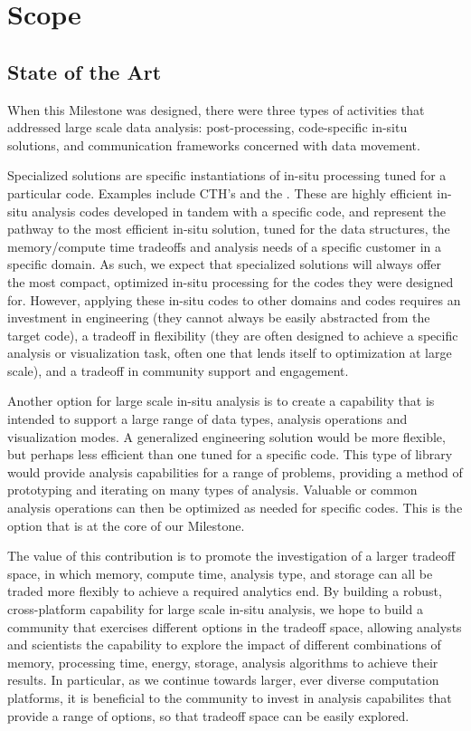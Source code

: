 \section{Scope}
\label{sec:Scope}

\subsection{State of the Art}

When this Milestone was designed, there were three types of activities that addressed large scale data analysis: post-processing, code-specific in-situ solutions, and communication frameworks concerned with data movement.

Specialized solutions are specific instantiations of in-situ processing tuned for a particular code.  Examples include CTH's  and the .  These are highly efficient in-situ analysis codes developed in tandem with a specific code, and represent the pathway to the most efficient in-situ solution, tuned for the data structures, the memory/compute time tradeoffs and analysis needs of a specific customer in a specific domain.  As such, we expect that specialized solutions will always offer the most compact, optimized in-situ processing for the codes they were designed for.  However, applying these in-situ codes to other domains and codes requires an investment in engineering (they cannot always be easily abstracted from the target code), a tradeoff in flexibility (they are often designed to achieve a specific analysis or visualization task, often one that lends itself to optimization at large scale), and a tradeoff in community support and engagement.

Another option for large scale in-situ analysis is to create a capability that is intended to support a large range of data types, analysis operations and visualization modes.  A generalized engineering solution would be more flexible, but perhaps less efficient than one tuned for a specific code.  This type of library would provide analysis capabilities for a range of problems, providing a method of prototyping and iterating on many types of analysis.  Valuable or common analysis operations can then be optimized as needed for specific codes.  This is the option that is at the core of our Milestone.

The value of this contribution is to promote the investigation of a larger tradeoff space, in which memory, compute time, analysis type, and storage can all be traded more flexibly to achieve a required analytics end.  By building a robust, cross-platform capability for large scale in-situ analysis, we hope to build a community that exercises different options in the tradeoff space, allowing analysts and scientists the capability to explore the impact of different combinations of memory, processing time, energy, storage, analysis algorithms to achieve their results.  In particular, as we continue towards larger, ever diverse computation platforms, it is beneficial to the community to invest in analysis capabilites that provide a range of options, so that tradeoff space can be easily explored.

